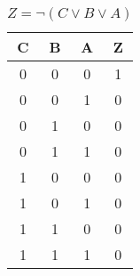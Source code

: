 
\begin{center}
    \begin{table}[h] \caption{\(Z = \lnot (C \lor B \lor A) \)}
        \begin{center}
            \begin{tabular}{|c|c|c||c|} \hline
            C & B & A & Z \\ \hline\hline
            0 & 0 & 0 & 1 \\ \hline
            0 & 0 & 1 & 0 \\ \hline
            0 & 1 & 0 & 0 \\ \hline
            0 & 1 & 1 & 0 \\ \hline
            1 & 0 & 0 & 0 \\ \hline
            1 & 0 & 1 & 0 \\ \hline
            1 & 1 & 0 & 0 \\ \hline
            1 & 1 & 1 & 0 \\ \hline
            \end{tabular}
        \end{center}
    \end{table}
\end{center}

